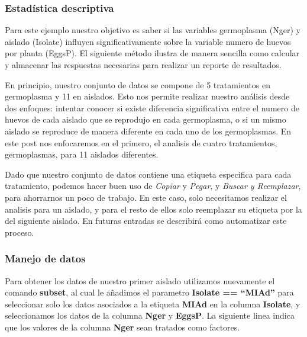 \documentclass[]{article}
\newenvironment{Shaded}{\begin{snugshade}}{\end{snugshade}}
\newcommand{\CommentTok}[1]{\textcolor[rgb]{0.56,0.35,0.01}{\textit{#1}}}
\newcommand{\DataTypeTok}[1]{\textcolor[rgb]{0.13,0.29,0.53}{#1}}
\newcommand{\KeywordTok}[1]{\textcolor[rgb]{0.13,0.29,0.53}{\textbf{#1}}}
\newcommand{\NormalTok}[1]{#1}
\newcommand{\OperatorTok}[1]{\textcolor[rgb]{0.81,0.36,0.00}{\textbf{#1}}}
\newcommand{\StringTok}[1]{\textcolor[rgb]{0.31,0.60,0.02}{#1}}
\begin{document}
\hypertarget{estadistica-descriptiva}{%
\subsubsection{Estadística descriptiva}\label{estadistica-descriptiva}}

Para este ejemplo nuestro objetivo es saber si las variables germoplasma
(Nger) y aislado (Isolate) influyen significativamente sobre la variable
numero de huevos por planta (EggsP). El siguiente método ilustra de
manera sencilla como calcular y almacenar las respuestas necesarias para
realizar un reporte de resultados.

En principio, nuestro conjunto de datos se compone de 5 tratamientos en
germoplasma y 11 en aislados. Esto nos permite realizar nuestro análisis
desde dos enfoques: intentar conocer si existe diferencia significativa
entre el numero de huevos de cada aislado que se reprodujo en cada
germoplasma, o si un mismo aislado se reproduce de manera diferente en
cada uno de los germoplasmas. En este post nos enfocaremos en el
primero, el analisis de cuatro tratamientos, germoplasmas, para 11
aislados diferentes.

Dado que nuestro conjunto de datos contiene una etiqueta especifica para
cada tratamiento, podemos hacer buen uso de \emph{Copiar} y
\emph{Pegar}, y \emph{Buscar y Reemplazar}, para ahorrarnos un poco de
trabajo. En este caso, solo necesitamos realizar el analisis para un
aislado, y para el resto de ellos solo reemplazar su etiqueta por la del
siguiente aislado. En futuras entradas se describirá como automatizar
este proceso.

\hypertarget{manejo-de-datos-1}{%
\subsubsection{Manejo de datos}\label{manejo-de-datos-1}}

Para obtener los datos de nuestro primer aislado utilizamos nuevamente
el comando \textbf{subset}, al cual le añadimos el parametro
\textbf{Isolate == ``MIAd''} para seleccionar solo los datos asociados a
la etiqueta \textbf{MIAd} en la columna \textbf{Isolate}, y
seleccionamos los datos de la columna \textbf{Nger} y \textbf{EggsP}. La
siguiente linea indica que los valores de la columna \textbf{Nger} sean
tratados como factores.

\begin{Shaded}
\end{Shaded}
\end{document}
